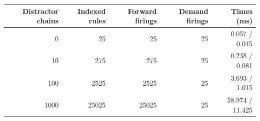 \begin{tabular}{rrrrr}
\toprule
Distractor chains & Indexed rules & Forward firings & Demand firings & Times (ms) \\
\midrule
0 & 25 & 25 & 25 & 0.057 / 0.045 \\
10 & 275 & 275 & 25 & 0.238 / 0.081 \\
100 & 2525 & 2525 & 25 & 3.693 / 1.015 \\
1000 & 25025 & 25025 & 25 & 58.974 / 11.425 \\
\bottomrule
\end{tabular}
